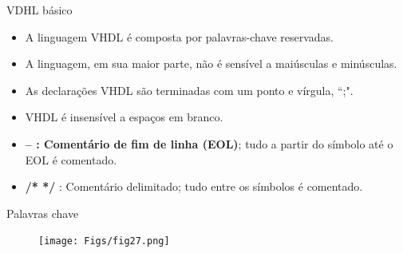 \documentclass[aspectratio=169]{beamer}
\begin{document}
\begin{frame}{VDHL básico}
	\justifying
	
	\begin{itemize}
		\justifying
		\item A linguagem VHDL é composta por palavras-chave reservadas.
		
		\item A linguagem, em sua maior parte, não é sensível a maiúsculas e minúsculas.
		
		\item As declarações VHDL são terminadas com um ponto e vírgula, ``;".
		
		\item VHDL é insensível a espaços em branco.
		
		\item \textbf{-- : Comentário de fim de linha (EOL)}; tudo a partir do símbolo até o EOL é comentado.
		
		\item \textbf{/* */} : Comentário delimitado; tudo entre os símbolos é comentado.
	\end{itemize}
	
	
\end{frame}
\begin{frame}{Palavras chave}
	\justifying
	
	
	\begin{figure}[h]
		\centering
		\texttt{[image: Figs/fig27.png]}
	\end{figure}
	
	
\end{frame}
\end{document}
